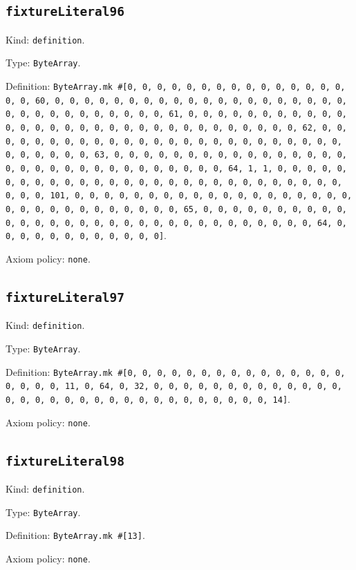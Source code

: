\documentclass[11pt]{article}
\begin{document}
\subsection*{\texttt{fixtureLiteral96}}
\noindent Kind: \texttt{definition}.\par
\noindent Type: \texttt{ByteArray}.\par
\noindent Definition: \texttt{ByteArray.mk \#[0, 0, 0, 0, 0, 0, 0, 0, 0, 0, 0, 0, 0, 0, 0, 0, 0, 60, 0, 0, 0, 0, 0, 0, 0, 0, 0, 0, 0, 0, 0, 0, 0, 0, 0, 0, 0, 0, 0, 0, 0, 0, 0, 0, 0, 0, 0, 0, 0, 61, 0, 0, 0, 0, 0, 0, 0, 0, 0, 0, 0, 0, 0, 0, 0, 0, 0, 0, 0, 0, 0, 0, 0, 0, 0, 0, 0, 0, 0, 0, 0, 62, 0, 0, 0, 0, 0, 0, 0, 0, 0, 0, 0, 0, 0, 0, 0, 0, 0, 0, 0, 0, 0, 0, 0, 0, 0, 0, 0, 0, 0, 0, 0, 63, 0, 0, 0, 0, 0, 0, 0, 0, 0, 0, 0, 0, 0, 0, 0, 0, 0, 0, 0, 0, 0, 0, 0, 0, 0, 0, 0, 0, 0, 0, 0, 64, 1, 1, 0, 0, 0, 0, 0, 0, 0, 0, 0, 0, 0, 0, 0, 0, 0, 0, 0, 0, 0, 0, 0, 0, 0, 0, 0, 0, 0, 0, 0, 0, 0, 101, 0, 0, 0, 0, 0, 0, 0, 0, 0, 0, 0, 0, 0, 0, 0, 0, 0, 0, 0, 0, 0, 0, 0, 0, 0, 0, 0, 0, 0, 0, 0, 65, 0, 0, 0, 0, 0, 0, 0, 0, 0, 0, 0, 0, 0, 0, 0, 0, 0, 0, 0, 0, 0, 0, 0, 0, 0, 0, 0, 0, 0, 0, 0, 64, 0, 0, 0, 0, 0, 0, 0, 0, 0, 0, 0, 0]}.\par
\noindent Axiom policy: \texttt{none}.\par
\subsection*{\texttt{fixtureLiteral97}}
\noindent Kind: \texttt{definition}.\par
\noindent Type: \texttt{ByteArray}.\par
\noindent Definition: \texttt{ByteArray.mk \#[0, 0, 0, 0, 0, 0, 0, 0, 0, 0, 0, 0, 0, 0, 0, 0, 0, 0, 0, 11, 0, 64, 0, 32, 0, 0, 0, 0, 0, 0, 0, 0, 0, 0, 0, 0, 0, 0, 0, 0, 0, 0, 0, 0, 0, 0, 0, 0, 0, 0, 0, 0, 0, 0, 0, 14]}.\par
\noindent Axiom policy: \texttt{none}.\par
\subsection*{\texttt{fixtureLiteral98}}
\noindent Kind: \texttt{definition}.\par
\noindent Type: \texttt{ByteArray}.\par
\noindent Definition: \texttt{ByteArray.mk \#[13]}.\par
\noindent Axiom policy: \texttt{none}.\par
\end{document}
